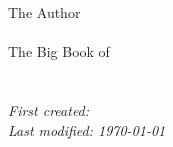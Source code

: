 \begin{titlepage}
  \raggedleft
  {\Large The Author\\ \pdfauthor\\[1in]}    
  {\large The Big Book of\\}
  {\Huge\scshape \bookname\\[.2in]}      
  {\large \bookoneword\\}    
  \vfill
  {\itshape First created: \timeandcompany\\ Last modified: \today}
  
\end{titlepage}
